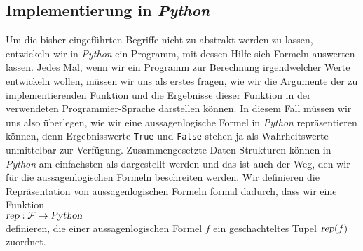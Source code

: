 \subsection{Implementierung in \textsl{Python}} 
Um die bisher eingeführten Begriffe nicht zu abstrakt werden zu lassen,
entwickeln wir in \textsl{Python} ein Programm, mit dessen Hilfe sich Formeln
auswerten lassen.  
Jedes Mal, wenn wir ein Programm zur Berechnung irgendwelcher Werte entwickeln wollen,
müssen wir uns als erstes fragen, wie wir die Argumente der zu implementierenden Funktion und die
Ergebnisse dieser Funktion in der verwendeten Programmier-Sprache darstellen können.
In diesem Fall müssen wir uns also überlegen, wie wir eine
aussagenlogische Formel in \textsl{Python} repräsentieren können, denn Ergebnisswerte
\texttt{True} und \texttt{False} stehen ja als Wahrheitswerte unmittelbar zur Verfügung.
Zusammengesetzte Daten-Strukturen können in \textsl{Python} am einfachsten als
 dargestellt werden und das ist auch der Weg, den wir für die aussagenlogischen
Formeln  beschreiten werden.  Wir definieren die Repräsentation von
aussagenlogischen Formeln formal dadurch, dass wir eine Funktion
\\[0.2cm]
\hspace*{1.3cm}
$\textsl{rep}: \mathcal{F} \rightarrow \textsl{Python}$
\\[0.2cm]
definieren, die einer aussagenlogischen Formel $f$ ein geschachteltes Tupel $\textsl{rep}(f)$ zuordnet.  
